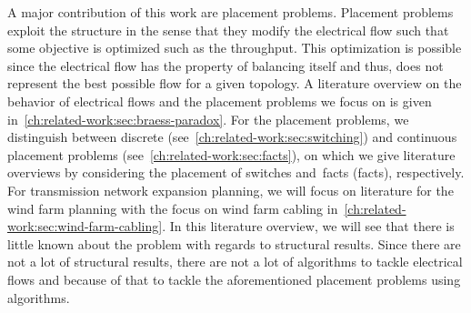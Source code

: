 A major contribution of this work are placement problems. Placement problems
exploit the structure in the sense that they modify the electrical flow such
that some objective is optimized such as the throughput. This optimization is
possible since the electrical flow has the property of balancing itself and
thus, does not represent the best possible flow for a given topology. A
literature overview on the behavior of electrical flows and the placement
problems we focus on is given in~\cref{ch:related-work:sec:braess-paradox}. For
the placement problems, we distinguish between discrete
(see~\cref{ch:related-work:sec:switching}) and continuous placement problems
(see~\cref{ch:related-work:sec:facts}), on which we give literature overviews by
considering the placement of switches and~\acrlong{facts} (\gls{facts}),
respectively. For transmission network expansion planning, we will focus on
literature for the wind farm planning with the focus on wind farm cabling
in~\cref{ch:related-work:sec:wind-farm-cabling}. In this literature overview, we
will see that there is little known about the problem with regards to structural
results. Since there are not a lot of structural results, there are not a lot of
algorithms to tackle electrical flows and because of that to tackle the
aforementioned placement problems using algorithms.
% 
